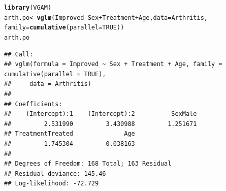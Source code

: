 \documentclass[11pt]{book}\usepackage[]{graphicx}\usepackage[]{color}
\makeatletter
\newcommand{\hlnum}[1]{\textcolor[rgb]{0.686,0.059,0.569}{#1}}%
\newcommand{\hlopt}[1]{\textcolor[rgb]{0,0,0}{#1}}%
\newcommand{\hlstd}[1]{\textcolor[rgb]{0.345,0.345,0.345}{#1}}%
\newcommand{\hlkwb}[1]{\textcolor[rgb]{0.69,0.353,0.396}{#1}}%
\newcommand{\hlkwc}[1]{\textcolor[rgb]{0.333,0.667,0.333}{#1}}%
\newcommand{\hlkwd}[1]{\textcolor[rgb]{0.737,0.353,0.396}{\textbf{#1}}}%
\newenvironment{kframe}{%
 \def\at@end@of@kframe{}%
 \ifinner\ifhmode%
  \def\at@end@of@kframe{\end{minipage}}%
  \begin{minipage}{\columnwidth}%
 \fi\fi%
 \def\FrameCommand##1{\hskip\@totalleftmargin \hskip-\fboxsep
 \colorbox{shadecolor}{##1}\hskip-\fboxsep
     \hskip-\linewidth \hskip-\@totalleftmargin \hskip\columnwidth}%
 \MakeFramed {\advance\hsize-\width
   \@totalleftmargin\z@ \linewidth\hsize
   \@setminipage}}%
 {\par\unskip\endMakeFramed%
 \at@end@of@kframe}
\newenvironment{knitrout}{}{} %
\renewenvironment{knitrout}{\small\renewcommand{\baselinestretch}{.85}}{} %
\makeatother
\begin{document}
\begin{knitrout}
\color{fgcolor}\begin{kframe}
\begin{alltt}
\hlkwd{library}\hlstd{(VGAM)}
\hlstd{arth.po} \hlkwb{<-} \hlkwd{vglm}\hlstd{(Improved} \hlopt{~} \hlstd{Sex} \hlopt{+} \hlstd{Treatment} \hlopt{+} \hlstd{Age,} \hlkwc{data}\hlstd{=Arthritis,}
                \hlkwc{family} \hlstd{=} \hlkwd{cumulative}\hlstd{(}\hlkwc{parallel}\hlstd{=}\hlnum{TRUE}\hlstd{))}
\hlstd{arth.po}
\end{alltt}
\begin{verbatim}
## Call:
## vglm(formula = Improved ~ Sex + Treatment + Age, family = cumulative(parallel = TRUE), 
##     data = Arthritis)
## 
## Coefficients:
##    (Intercept):1    (Intercept):2          SexMale 
##         2.531990         3.430988         1.251671 
## TreatmentTreated              Age 
##        -1.745304        -0.038163 
## 
## Degrees of Freedom: 168 Total; 163 Residual
## Residual deviance: 145.46 
## Log-likelihood: -72.729
\end{verbatim}
\end{kframe}
\end{knitrout}
\end{document}

